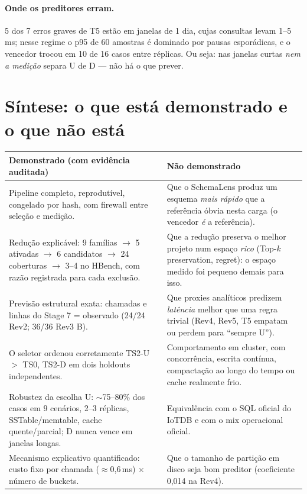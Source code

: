 \documentclass[11pt,a4paper]{article}
\begin{document}
\paragraph{Onde os preditores erram.} 5 dos 7 erros graves de T5 estão em janelas de 1 dia, cujas consultas levam 1--5\,ms; nesse regime o p95 de 60 amostras é dominado por pausas esporádicas, e o vencedor trocou em 10 de 16 casos entre réplicas. Ou seja: nas janelas curtas \emph{nem a medição} separa U de D --- não há o que prever.

\section{Síntese: o que está demonstrado e o que não está}

\begin{table}[H]\centering\small
\begin{tabularx}{\linewidth}{@{}YY@{}}\toprule
\textbf{Demonstrado (com evidência auditada)} & \textbf{Não demonstrado}\\\midrule
Pipeline completo, reprodutível, congelado por hash, com firewall entre seleção e medição. &
Que o SchemaLens produz um esquema \emph{mais rápido} que a referência óbvia nesta carga (o vencedor \emph{é} a referência).\\
Redução explicável: 9 famílias $\to$ 5 ativadas $\to$ 6 candidatos $\to$ 24 coberturas $\to$ 3--4 no HBench, com razão registrada para cada exclusão. &
Que a redução preserva o melhor projeto num espaço \emph{rico} (Top-$k$ preservation, regret): o espaço medido foi pequeno demais para isso.\\
Previsão estrutural exata: chamadas e linhas do Stage 7 = observado (24/24 Rev2; 36/36 Rev3 B). &
Que proxies analíticos predizem \emph{latência} melhor que uma regra trivial (Rev4, Rev5, T5 empatam ou perdem para ``sempre U'').\\
O seletor ordenou corretamente TS2-U $>$ TS0, TS2-D em dois holdouts independentes. &
Comportamento em cluster, com concorrência, escrita contínua, compactação ao longo do tempo ou cache realmente frio.\\
Robustez da escolha U: $\sim$75--80\% dos casos em 9 cenários, 2--3 réplicas, SSTable/memtable, cache quente/parcial; D nunca vence em janelas longas. &
Equivalência com o SQL oficial do IoTDB e com o mix operacional oficial.\\
Mecanismo explicativo quantificado: custo fixo por chamada ($\approx$0,6\,ms) $\times$ número de buckets. &
Que o tamanho de partição em disco seja bom preditor (coeficiente 0,014 na Rev4).\\\bottomrule
\end{tabularx}\end{table}
\end{document}
